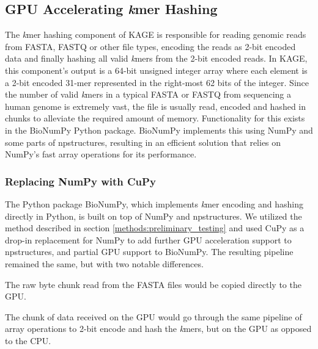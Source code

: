 \subsection{GPU Accelerating \textit{k}mer Hashing} \label{methods:gpu_accelerating_kmer_hashing}
The \textit{k}mer hashing component of KAGE is responsible for reading genomic reads from FASTA, FASTQ or other file types, encoding the reads as 2-bit encoded data and finally hashing all valid \textit{k}mers from the 2-bit encoded reads.
In KAGE, this component's output is a 64-bit unsigned integer array where each element is a 2-bit encoded 31-mer represented in the right-most 62 bits of the integer.
Since the number of valid \textit{k}mers in a typical FASTA or FASTQ from sequencing a human genome is extremely vast, the file is usually read, encoded and hashed in chunks to alleviate the required amount of memory.
Functionality for this exists in the BioNumPy Python package.
BioNumPy implements this using NumPy and some parts of npstructures, resulting in an efficient solution that relies on NumPy's fast array operations for its performance.

\subsubsection{Replacing NumPy with CuPy}
The Python package BioNumPy, which implements \textit{k}mer encoding and hashing directly in Python, is built on top of NumPy and npstructures.
We utilized the method described in section \ref{methods:preliminary_testing} and used CuPy as a drop-in replacement for NumPy to add further GPU acceleration support to npstructures, and partial GPU support to BioNumPy.
The resulting pipeline remained the same, but with two notable differences.
\begin{compactenum}
  \item The raw byte chunk read from the FASTA files would be copied directly to the GPU.
  \item The chunk of data received on the GPU would go through the same pipeline of array operations to 2-bit encode and hash the \textit{k}mers, but on the GPU as opposed to the CPU.
\end{compactenum}


